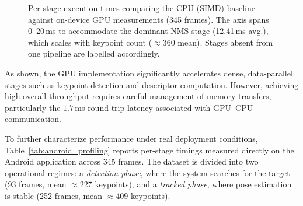 \begin{figure}[htbp]
{%
}
\caption{Per-stage execution times comparing the CPU (SIMD) baseline against on-device GPU measurements (345 frames). The axis spans 0--20\,ms to accommodate the dominant NMS stage (12.41\,ms avg.), which scales with keypoint count ($\approx$360 mean). Stages absent from one pipeline are labelled accordingly.}
\label{fig:profiling_chart}
\end{figure}

As shown, the GPU implementation significantly accelerates dense, data-parallel stages such as keypoint detection and descriptor computation. However, achieving high overall throughput requires careful management of memory transfers, particularly the $1.7$\,ms round-trip latency associated with GPU--CPU communication.

To further characterize performance under real deployment conditions, Table~\ref{tab:android_profiling} reports per-stage timings measured directly on the Android application across 345 frames. The dataset is divided into two operational regimes: a \emph{detection phase}, where the system searches for the target (93 frames, mean $\approx$227 keypoints), and a \emph{tracked phase}, where pose estimation is stable (252 frames, mean $\approx$409 keypoints).

